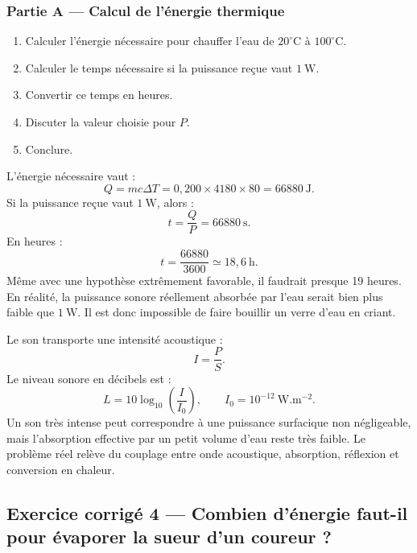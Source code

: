 \documentclass[11pt,a4paper]{article}
\begin{document}
\subsubsection*{Partie A — Calcul de l'énergie thermique}

\begin{enumerate}
  \item Calculer l'énergie nécessaire pour chauffer l'eau de \(20^\circ\mathrm C\) à \(100^\circ\mathrm C\).
  \item Calculer le temps nécessaire si la puissance reçue vaut \(1\ \mathrm W\).
  \item Convertir ce temps en heures.
  \item Discuter la valeur choisie pour \(P\).
  \item Conclure.
\end{enumerate}

\begin{corrigebox}[Correction]
L'énergie nécessaire vaut :
\[
Q=mc\Delta T
=
0{,}200\times4180\times80
=
66880\ \mathrm J.
\]
Si la puissance reçue vaut \(1\ \mathrm W\), alors :
\[
t=\frac{Q}{P}=66880\ \mathrm s.
\]
En heures :
\[
t=\frac{66880}{3600}\simeq18{,}6\ \mathrm h.
\]
Même avec une hypothèse extrêmement favorable, il faudrait presque 19 heures. En réalité, la puissance sonore réellement absorbée par l'eau serait bien plus faible que \(1\ \mathrm W\). Il est donc impossible de faire bouillir un verre d'eau en criant.
\end{corrigebox}

\begin{approfondissementbox}
Le son transporte une intensité acoustique :
\[
I=\frac{P}{S}.
\]
Le niveau sonore en décibels est :
\[
L=10\log_{10}\left(\frac{I}{I_0}\right),
\qquad
I_0=10^{-12}\ \mathrm{W.m^{-2}}.
\]
Un son très intense peut correspondre à une puissance surfacique non négligeable, mais l'absorption effective par un petit volume d'eau reste très faible. Le problème réel relève du couplage entre onde acoustique, absorption, réflexion et conversion en chaleur.
\end{approfondissementbox}

\subsection{Exercice corrigé 4 — Combien d'énergie faut-il pour évaporer la sueur d'un coureur ?}
\end{document}

